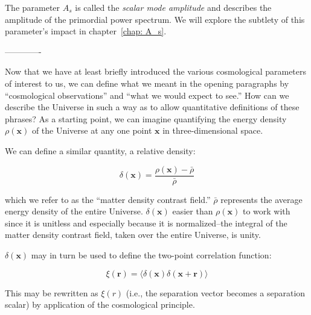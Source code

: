 
The parameter $A_s$ is called the \textit{scalar mode amplitude} and describes
the amplitude of the primordial power spectrum. We will explore the subtlety of this parameter's impact in
chapter~\ref{chap: A_s}.

-------------

Now that we have at least briefly introduced the various cosmological
parameters of interest to us, we can define what we meant in the opening
paragraphs by ``cosmological observations'' and ``what we would expect to
see.'' How can we describe the Universe in such a way as to allow quantitative 
definitions of these phrases? As a starting point, we can imagine quantifying 
the energy density $\rho(\bm{x})$ of the Universe at any one point $\bm{x}$ in 
three-dimensional space.


We can define a similar quantity, a relative density:

\begin{equation}
\delta(\bm{x}) = \frac{\rho(\bm{x}) - \bar{\rho}}{\bar{\rho}}
\end{equation}

which we refer to as the ``matter density contrast field.'' $\bar{\rho}$
represents the average energy density of the entire Universe. 
$\delta(\bm{x})$ easier than $\rho(\bm{x})$ to work with since it
is unitless and especially because it is normalized--the integral of the
matter density contrast field, taken over the entire Universe, is unity.

$\delta(\bm{x})$ may in turn be used to define the two-point correlation 
function:

\begin{equation}
\xi(\bm{r})
=
\langle \delta (\mathbf{x}) \delta(\mathbf{x} + \mathbf{r})\rangle
\end{equation}

This may be rewritten as $\xi(r)$ (i.e., the separation vector becomes a
separation scalar) by application of the cosmological principle.

